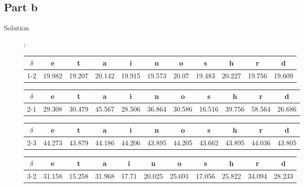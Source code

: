\documentclass[a4paper,11pt]{article}
\begin{document}
\subsection{Part b}
\begin{description}
  \item [Solution]: 

\begin{center}
\begin{tabular}{ c|c|c|c|c|c|c|c|c|c|c }
  $\delta$ & e & t & a & i & n & o & s & h & r & d \\ \hline
  1-2 &    19.982 & 19.207  &20.142  &19.915  &19.573  &20.07  & 19.483 & 20.227  &19.756 &19.609
\end{tabular}
\begin{tabular}{ c|c| c|c|c|c| c|c|c|c| c }   
  $\delta$ & e & t & a & i & n & o & s & h & r & d \\ \hline                              
    2-1 & 29.308 & 30.479 & 45.567 & 28.506 & 36.864 & 30.586 & 16.516 & 39.756 & 58.564& 26.686
\end{tabular}
\begin{tabular}{ c|c|c|c|c|c|c|c|c|c|c }
  $\delta$ & e & t & a & i & n & o & s & h & r & d \\ \hline
    2-3 &  44.273 & 43.879 & 44.186 & 44.206 & 43.895 & 44.205 & 43.662 & 43.895 & 44.036& 43.805
\end{tabular}                                                                
\begin{tabular}{ c|c|c|c|c|c|c|c|c|c|c }        
  $\delta$ & e & t & a & i & n & o & s & h & r & d \\ \hline                         
    3-2  & 31.158 & 15.258 & 31.968 & 17.71  & 20.025 & 25.691 & 17.056 & 25.822 & 34.094& 28.233
\end{tabular}                                                                
\end{center}
\end{description}
\end{document}
